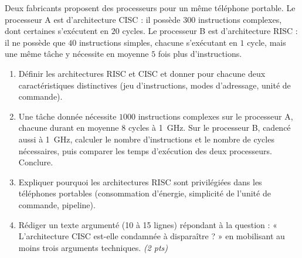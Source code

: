 \documentclass[11pt]{article}
\begin{document}
\begin{exercice}
Deux fabricants proposent des processeurs pour un même téléphone portable. Le processeur A est d'architecture CISC : il possède $300$ instructions complexes, dont certaines s'exécutent en $20$ cycles. Le processeur B est d'architecture RISC : il ne possède que $40$ instructions simples, chacune s'exécutant en $1$ cycle, mais une même tâche y nécessite en moyenne $5$ fois plus d'instructions.

\begin{enumerate}
\item Définir les architectures RISC et CISC et donner pour chacune deux caractéristiques distinctives (jeu d'instructions, modes d'adressage, unité de commande).
\item Une tâche donnée nécessite $1000$ instructions complexes sur le processeur A, chacune durant en moyenne $8$ cycles à \SI{1}{\giga\hertz}. Sur le processeur B, cadencé aussi à \SI{1}{\giga\hertz}, calculer le nombre d'instructions et le nombre de cycles nécessaires, puis comparer les temps d'exécution des deux processeurs. Conclure.
\item Expliquer pourquoi les architectures RISC sont privilégiées dans les téléphones portables (consommation d'énergie, simplicité de l'unité de commande, pipeline).
\item Rédiger un texte argumenté (10 à 15 lignes) répondant à la question : « L'architecture CISC est-elle condamnée à disparaître ? » en mobilisant au moins trois arguments techniques. \emph{(2 pts)}
\end{enumerate}
\end{exercice}
\end{document}
